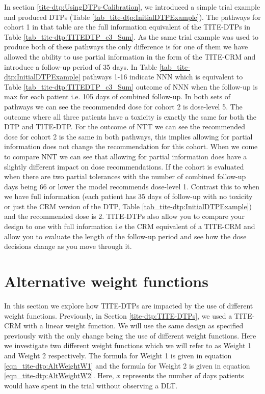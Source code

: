 In section \ref{tite-dtp:UsingDTPs-Calibration}, we introduced a simple trial example and produced DTPs (Table \ref{tab_tite-dtp:InitialDTPExample}). The pathways for cohort 1 in that table are the full information equivalent of the TITE-DTPs in Table \ref{tab_tite-dtp:TITEDTP_c3_Sum}. As the same trial example was used to produce both of these pathways the only difference is for one of them we have allowed the ability to use partial information in the form of the TITE-CRM and introduce a follow-up period of 35 days. In Table \ref{tab_tite-dtp:InitialDTPExample} pathways 1-16 indicate NNN which is equivalent to Table \ref{tab_tite-dtp:TITEDTP_c3_Sum} outcome of NNN when the follow-up is max for each patient i.e. 105 days of combined follow-up. In both sets of pathways we can see the recommended dose for cohort 2 is dose-level 5. The outcome where all three patients have a toxicity is exactly the same for both the DTP and TITE-DTP. For the outcome of NTT we can see the recommended dose for cohort 2 is the same in both pathways, this implies allowing for partial information does not change the recommendation for this cohort. When we come to compare NNT we can see that allowing for partial information does have a slightly different impact on dose recommendations. If the cohort is evaluated when there are two partial tolerances with the number of combined follow-up days being 66 or lower the model recommends dose-level 1. Contrast this to when we have full information (each patient has 35 days of follow-up with no toxicity or just the CRM version of the DTP, Table \ref{tab_tite-dtp:InitialDTPExample}) and the recommended dose is 2. TITE-DTPs also allow you to compare your design to one with full information i.e the CRM equivalent of a TITE-CRM and allow you to evaluate the length of the follow-up period and see how the dose decisions change as you move through it. 


\section{Alternative weight functions}
\label{tite-dtp:AltWeightFunc}

In this section we explore how TITE-DTPs are impacted by the use of different weight functions. Previously, in Section \ref{tite-dtp:TITE-DTPs}, we used a TITE-CRM with a linear weight function. We will use the same design as specified previously with the only change being the use of different weight functions. Here we investigate two different weight functions which we will refer to as Weight 1 and Weight 2 respectively. The formula for Weight 1 is given in equation \ref{eqn_tite-dtp:AltWeightW1} and the formula for Weight 2 is given in equation \ref{eqn_tite-dtp:AltWeightW2}. Here, $x$ represents the number of days patients would have spent in the trial without observing a DLT. 

